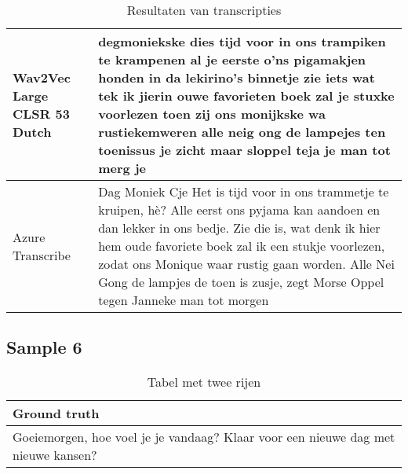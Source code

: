 \begin{table}[htbp]
\begin{tabularx}{\textwidth}{|l|X|}
    Wav2Vec Large CLSR 53 Dutch &     degmoniekske dies tijd voor in ons trampiken te krampenen al je eerste o'ns pigamakjen honden in da lekirino's binnetje zie iets wat tek ik jierin ouwe favorieten boek zal je stuxke voorlezen toen zij ons monijkske wa rustiekemweren alle neig ong de lampejes ten toenissus je zicht maar sloppel teja je man tot merg je
    \\ \hline
    
    Azure Transcribe & Dag Moniek Cje Het is tijd voor in ons trammetje te kruipen, hè? Alle eerst ons pyjama kan aandoen en dan lekker in ons bedje. Zie die is, wat denk ik hier hem oude favoriete boek zal ik een stukje voorlezen, zodat ons Monique waar rustig gaan worden. Alle Nei Gong de lampjes de toen is zusje, zegt Morse Oppel tegen Janneke man tot morgen
    \\ \hline
\end{tabularx}
    \caption{Resultaten van transcripties}
\end{table}
\FloatBarrier

\subsection{Sample 6}
\begin{table}[htbp]
    \centering
    \label{tab:groundtruth_sample6}
    \begin{tabularx}{\textwidth}{|X|}
        \hline
        \textbf{Ground truth} \\
        
        \hline
        Goeiemorgen, hoe voel je je vandaag? Klaar voor een nieuwe dag met nieuwe kansen? \\
        \hline
    \end{tabularx}
    \caption{Tabel met twee rijen}
\end{table}

